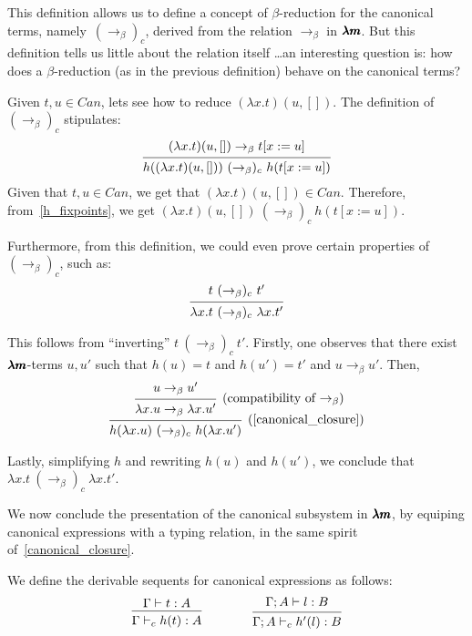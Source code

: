 This definition allows us to define a concept of $\beta$-reduction for the canonical terms, namely~${(\to_\beta)}_c$, derived from the relation $\to_\beta$ in $\pmb{\lambda m}$.
But this definition tells us little about the relation itself \dots an interesting question is: how does a $\beta$-reduction (as in the previous definition) behave on the canonical terms?

Given $t, u \in Can$, lets see how to reduce $(\lambda x . t)(u, [])$.
The definition of $(\to_\beta)_c$ stipulates: 
\[ \begin{prooftree}
    \hypo{ (\lambda x.t)(u, []) \to_\beta t[x := u] }
    \infer1[]{ h((\lambda x.t)(u, [])) \ (\to_\beta)_c \ h(t[x := u]) }
  \end{prooftree} \]
Given that $t, u \in Can$, we get that $(\lambda x.t)(u, []) \in Can$.
Therefore, from~\cref{h_fixpoints}, we get $(\lambda x.t)(u, []) \ (\to_\beta)_c \ h(t[x := u])$.

Furthermore, from this definition, we could even prove certain properties of $(\to_\beta)_c$, such as:
\[ \begin{prooftree}
    \hypo{ t \ (\to_\beta)_c \ t' }
    \infer1{ \lambda x.t \ (\to_\beta)_c \ \lambda x.t' }.
  \end{prooftree} \]

This follows from ``inverting'' $t \ (\to_\beta)_c \ t'$.
Firstly, one observes that there exist $\pmb{\lambda m}$-terms $u, u'$ such that $h(u) = t$ and $h(u') = t'$ and $u \to_\beta u'$.
Then, 
\[ \begin{prooftree}
    \hypo{ u \to_\beta u' }
    \infer1[\text{(compatibility of $\to_\beta$)}]{ \lambda x.u \to_\beta \lambda x.u' }
    \infer1[\text{(\cref{canonical_closure})}]{ h(\lambda x.u) \ (\to_\beta)_c \ h(\lambda x.u') }
  \end{prooftree} \]

Lastly, simplifying $h$ and rewriting $h(u)$ and $h(u')$, we conclude that $\lambda x.t \ (\to_\beta)_c \ \lambda x.t'$.

We now conclude the presentation of the canonical subsystem in $\pmb{\lambda m}$, by equiping canonical expressions with a typing relation, in the same spirit of~\cref{canonical_closure}.

\begin{definition}
  \label{canonical_typing}
  We define the derivable sequents for canonical expressions as follows:
  \[
    \begin{prooftree}
      \hypo{ \Gamma \vdash t:A }
      \infer1{ \Gamma \vdash_c h(t):A } 
    \end{prooftree}
    \qquad \qquad
    \begin{prooftree}
      \hypo{ \Gamma ; A \vdash l:B }
      \infer1{ \Gamma ; A \vdash_c h'(l):B }.
    \end{prooftree}
  \]
\end{definition}

